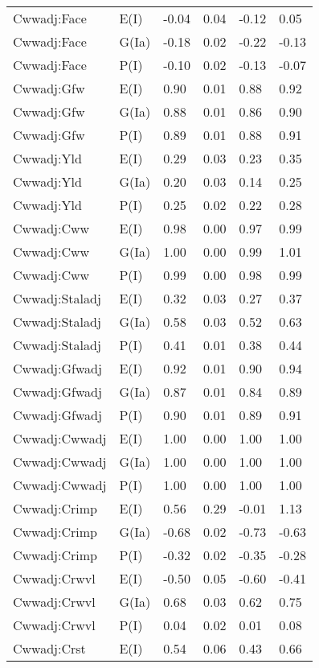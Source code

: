 \begin{center}
\begin{longtable}{|p{1.1in}|p{0.7in}|p{0.7in}|p{0.6in}|p{0.6in}|p{0.6in}|}
  Cwwadj:Face & E(I) & -0.04 & 0.04 & -0.12 & 0.05 \\ 
  Cwwadj:Face & G(Ia) & -0.18 & 0.02 & -0.22 & -0.13 \\ 
  Cwwadj:Face & P(I) & -0.10 & 0.02 & -0.13 & -0.07 \\ 
  Cwwadj:Gfw & E(I) & 0.90 & 0.01 & 0.88 & 0.92 \\ 
  Cwwadj:Gfw & G(Ia) & 0.88 & 0.01 & 0.86 & 0.90 \\ 
  Cwwadj:Gfw & P(I) & 0.89 & 0.01 & 0.88 & 0.91 \\ 
  Cwwadj:Yld & E(I) & 0.29 & 0.03 & 0.23 & 0.35 \\ 
  Cwwadj:Yld & G(Ia) & 0.20 & 0.03 & 0.14 & 0.25 \\ 
  Cwwadj:Yld & P(I) & 0.25 & 0.02 & 0.22 & 0.28 \\ 
  Cwwadj:Cww & E(I) & 0.98 & 0.00 & 0.97 & 0.99 \\ 
  Cwwadj:Cww & G(Ia) & 1.00 & 0.00 & 0.99 & 1.01 \\ 
  Cwwadj:Cww & P(I) & 0.99 & 0.00 & 0.98 & 0.99 \\ 
  Cwwadj:Staladj & E(I) & 0.32 & 0.03 & 0.27 & 0.37 \\ 
  Cwwadj:Staladj & G(Ia) & 0.58 & 0.03 & 0.52 & 0.63 \\ 
  Cwwadj:Staladj & P(I) & 0.41 & 0.01 & 0.38 & 0.44 \\ 
  Cwwadj:Gfwadj & E(I) & 0.92 & 0.01 & 0.90 & 0.94 \\ 
  Cwwadj:Gfwadj & G(Ia) & 0.87 & 0.01 & 0.84 & 0.89 \\ 
  Cwwadj:Gfwadj & P(I) & 0.90 & 0.01 & 0.89 & 0.91 \\ 
  Cwwadj:Cwwadj & E(I) & 1.00 & 0.00 & 1.00 & 1.00 \\ 
  Cwwadj:Cwwadj & G(Ia) & 1.00 & 0.00 & 1.00 & 1.00 \\ 
  Cwwadj:Cwwadj & P(I) & 1.00 & 0.00 & 1.00 & 1.00 \\ 
  Cwwadj:Crimp & E(I) & 0.56 & 0.29 & -0.01 & 1.13 \\ 
  Cwwadj:Crimp & G(Ia) & -0.68 & 0.02 & -0.73 & -0.63 \\ 
  Cwwadj:Crimp & P(I) & -0.32 & 0.02 & -0.35 & -0.28 \\ 
  Cwwadj:Crwvl & E(I) & -0.50 & 0.05 & -0.60 & -0.41 \\ 
  Cwwadj:Crwvl & G(Ia) & 0.68 & 0.03 & 0.62 & 0.75 \\ 
  Cwwadj:Crwvl & P(I) & 0.04 & 0.02 & 0.01 & 0.08 \\ 
  Cwwadj:Crst & E(I) & 0.54 & 0.06 & 0.43 & 0.66 \\ 

\end{longtable}
\end{center}
